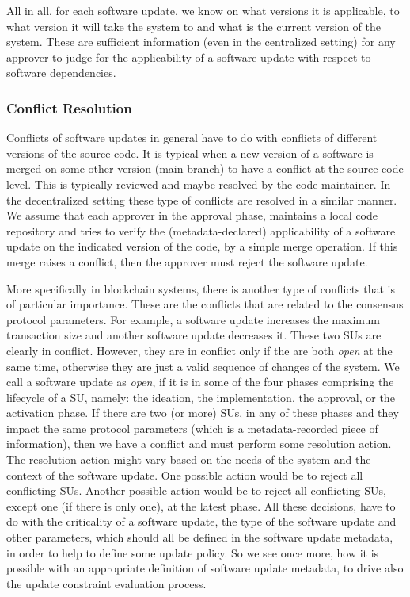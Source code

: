 All in all, for each software update, we know on what versions it is applicable, to what version it will take the system to and what is the current version of the system. These are sufficient information (even in the centralized setting) for any approver to judge for the applicability of a software update with respect to software dependencies.

%
%

\subsubsection{Conflict Resolution}
Conflicts of software updates in general have to do with conflicts of different versions of the source code. It is typical when a new version of a software is merged on some other version (main branch) to have a conflict at the source code level. This is typically reviewed and maybe resolved by the code maintainer. In the decentralized setting these type of conflicts are resolved in a similar manner. We assume that each approver in the approval phase, maintains a local code repository and tries to verify the (metadata-declared) applicability of a software update on the indicated version of the code, by a simple merge operation. If this merge raises a conflict, then the approver must reject the software update.

More specifically in blockchain systems, there is another type of conflicts that is of particular importance. These are the conflicts that are related to the consensus protocol parameters. For example, a software update increases the maximum transaction size and another software update decreases it. These two SUs are clearly in conflict. However, they are in conflict only if the are both \emph{open} at the same time, otherwise they are just a valid sequence of changes of the system. We call a software update as \emph{open}, if it is in some of the four phases comprising the lifecycle of a SU, namely: the ideation, the implementation, the approval, or the activation phase. If there are two (or more) SUs, in any of these phases and they impact the same protocol parameters (which is a metadata-recorded piece of information), then we have a conflict and must perform some resolution action. The resolution action might vary based on the needs of the system and the context of the software update. One possible action would be to reject all conflicting SUs. Another possible action would be to reject all conflicting SUs, except one (if there is only one), at the latest phase. All these decisions, have to do with the criticality of a software update, the type of the software update and other parameters, which should all be defined in the software update metadata, in order to help to define some update policy. So we see once more, how it is possible with an appropriate definition of software update metadata, to drive also the update constraint evaluation process.

